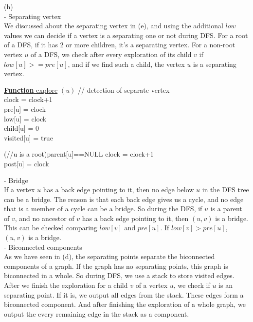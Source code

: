 \documentclass{article}
\begin{document}
(h) \\
- Separating vertex \\
We discussed about the separating vertex in (e), and using the additional $low$ values we can decide if a vertex is a separating one or not during DFS. For a root of a DFS, if it has 2 or more children, it's a separating vertex. For a non-root vertex $u$ of a DFS, we check after every exploration of its child $v$ if $low[u]>=pre[u]$, and if we find such a child, the vertex $u$ is a separating vertex.\\
\begin{function}
	\underline{{\bf Function} explore} $(u)$\; // detection of separate vertex\\
	clock = clock+1\\
	pre[u] = clock\\
	low[u] = clock\\
	child[u] = 0\\
	visited[u] = true \\

	\If(//u is a root){parent[u]==NULL}{
	}
	clock =	clock+1\\
	post[u] = clock\\
\end{function}
- Bridge \\
If a vertex $u$ has a back edge pointing to it, then no edge below $u$ in the DFS tree can be a bridge. The reason is that each back edge gives us a cycle, and no edge that is a member of a cycle can be a bridge. So during the DFS, if $u$ is a parent of $v$, and no ancestor of $v$ has a back edge pointing to it, then $(u, v)$ is a bridge. This can be checked comparing $low[v]$ and $pre[u]$. If $low[v]>pre[u]$, $(u,v)$ is a bridge. \\\textsl{}
- Biconnected components\\
As we have seen in (d), the separating points separate the biconnected components of a graph. If the graph has no separating points, this graph is biconnected in a whole. So during DFS, we use a stack to store visited edges. After we finish the exploration for a child $v$ of a vertex $u$, we check if $u$ is an separating point. If it is, we output all edges from the stack. These edges form a biconnected component. And after finishing the exploration of a whole graph, we output the every remaining edge in the stack as a component.\\
\end{document}

